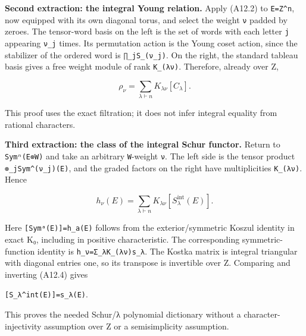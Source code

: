 \documentclass[
  10pt,
]{article}
\begin{document}
\textbf{Second extraction: the integral Young relation.} Apply (A12.2)
to \texttt{\small E=\allowbreak{}Z\textasciicircum{}n}, now equipped
with its own diagonal torus, and select the weight \texttt{\small ν}
padded by zeroes. The tensor-word basis on the left is the set of words
with each letter \texttt{\small j} appearing
\texttt{\small ν\_\allowbreak{}j} times. Its permutation action is the
Young coset action, since the stabilizer of the ordered word is
\texttt{\small ∏\_\allowbreak{}jS\_\allowbreak{}(\allowbreak{}ν\_\allowbreak{}j)\allowbreak{}}.
On the right, the standard tableau basis gives a free weight module of
rank \texttt{\small K\_\allowbreak{}(\allowbreak{}λν)\allowbreak{}}.
Therefore, already over Z,

\[
\rho_\nu=\sum_{\lambda\vdash n}K_{\lambda\nu}[C_\lambda].
\tag{A12.3}
\]

This proof uses the exact filtration; it does not infer integral
equality from rational characters.

\textbf{Third extraction: the class of the integral Schur functor.}
Return to
\texttt{\small Symⁿ(\allowbreak{}E⊗\allowbreak{}W)\allowbreak{}} and
take an arbitrary \texttt{\small W}-weight \texttt{\small ν}. The left
side is the tensor product
\texttt{\small ⊗\allowbreak{}\_\allowbreak{}jSym\textasciicircum{}(\allowbreak{}ν\_\allowbreak{}j)\allowbreak{}(\allowbreak{}E)\allowbreak{}},
and the graded factors on the right have multiplicities
\texttt{\small K\_\allowbreak{}(\allowbreak{}λν)\allowbreak{}}. Hence

\[
h_\nu(E)=\sum_{\lambda\vdash n}K_{\lambda\nu}[S_\lambda^{\mathrm{int}}(E)].
\tag{A12.4}
\]

Here
\texttt{\small [\allowbreak{}Symᵃ(\allowbreak{}E)\allowbreak{}]\allowbreak{}=\allowbreak{}h\_\allowbreak{}a(\allowbreak{}E)\allowbreak{}}
follows from the exterior/symmetric Koszul identity in exact K₀,
including in positive characteristic. The corresponding
symmetric-function identity is
\texttt{\small h\_\allowbreak{}ν=\allowbreak{}Σ\_\allowbreak{}λK\_\allowbreak{}(\allowbreak{}λν)\allowbreak{}s\_\allowbreak{}λ}.
The Kostka matrix is integral triangular with diagonal entries one, so
its transpose is invertible over Z. Comparing and inverting (A12.4)
gives

\texttt{\small [\allowbreak{}S\_\allowbreak{}λ\textasciicircum{}int(\allowbreak{}E)\allowbreak{}]\allowbreak{}=\allowbreak{}s\_\allowbreak{}λ(\allowbreak{}E)\allowbreak{}}.

This proves the needed Schur/λ polynomial dictionary without a
character-injectivity assumption over Z or a semisimplicity assumption.
\end{document}
